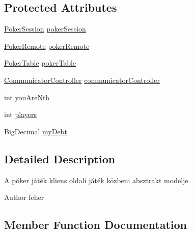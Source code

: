 \subsection*{Protected Attributes}
\begin{DoxyCompactItemize}
\item 
\hyperlink{classhu_1_1elte_1_1bfw1p6_1_1poker_1_1model_1_1_poker_session}{Poker\+Session} \hyperlink{classhu_1_1elte_1_1bfw1p6_1_1poker_1_1client_1_1model_1_1_abstract_main_game_model_a1dc8e9e0e7d6da4d5d655a281f5e32ac}{poker\+Session}
\item 
\hyperlink{interfacehu_1_1elte_1_1bfw1p6_1_1poker_1_1rmi_1_1_poker_remote}{Poker\+Remote} \hyperlink{classhu_1_1elte_1_1bfw1p6_1_1poker_1_1client_1_1model_1_1_abstract_main_game_model_a13372680285464503414f8de7130f298}{poker\+Remote}
\item 
\hyperlink{classhu_1_1elte_1_1bfw1p6_1_1poker_1_1model_1_1entity_1_1_poker_table}{Poker\+Table} \hyperlink{classhu_1_1elte_1_1bfw1p6_1_1poker_1_1client_1_1model_1_1_abstract_main_game_model_a649e9c1682cf7daa72adbb5de17ed8fd}{poker\+Table}
\item 
\hyperlink{classhu_1_1elte_1_1bfw1p6_1_1poker_1_1client_1_1controller_1_1main_1_1_communicator_controller}{Communicator\+Controller} \hyperlink{classhu_1_1elte_1_1bfw1p6_1_1poker_1_1client_1_1model_1_1_abstract_main_game_model_a0adcdebb5bfb2f8e958584d49d650386}{communicator\+Controller}
\item 
int \hyperlink{classhu_1_1elte_1_1bfw1p6_1_1poker_1_1client_1_1model_1_1_abstract_main_game_model_acdec9afb7f6be033570ccd2be4d18482}{you\+Are\+Nth}
\item 
int \hyperlink{classhu_1_1elte_1_1bfw1p6_1_1poker_1_1client_1_1model_1_1_abstract_main_game_model_a2874c296caff9aeb1809e5c24029eee1}{players}
\item 
Big\+Decimal \hyperlink{classhu_1_1elte_1_1bfw1p6_1_1poker_1_1client_1_1model_1_1_abstract_main_game_model_a22eb0eb3c400b36e2164b3536711583e}{my\+Debt}
\end{DoxyCompactItemize}


\subsection{Detailed Description}
A póker játék kliens oldali játék közbeni absztrakt modelje. \begin{DoxyAuthor}{Author}
feher 
\end{DoxyAuthor}


\subsection{Member Function Documentation}
\hypertarget{classhu_1_1elte_1_1bfw1p6_1_1poker_1_1client_1_1model_1_1_abstract_main_game_model_a011be8a1456cf327d97bf5b6d24e7541}{}
